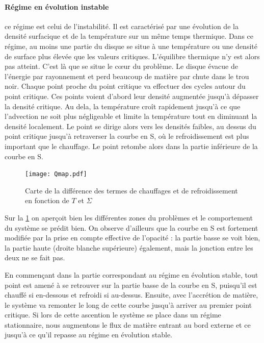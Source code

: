 \paragraph{Régime en évolution instable} ce régime est celui de l'instabilité.
Il est caractérisé par une évolution de la densité surfacique et de la
température sur un même temps thermique. Dans ce régime, au moins une partie du
disque se situe à une température ou une densité de surface plus élevée que les
valeurs critiques. L'équilibre thermique n'y est alors pas atteint. C'est là
que se situe le cœur du problème. Le disque évacue de l'énergie par rayonnement
et perd beaucoup de matière par chute dans le trou noir. Chaque point proche du
point critique va effectuer des cycles autour du point critique. Ces points
voient d'abord leur densité augmentée jusqu'à dépasser la densité critique. Au
dela, la température croît rapidement jusqu'à ce que l'advection ne soit plus
négligeable et limite la température tout en diminuant la densité localement.
Le point se dirige alors vers les densités faibles, au dessus du point critique
jusqu'à retraverser la courbe en S, où le refroidissement est plus important
que le chauffage. Le point retombe alors dans la partie inférieure de la courbe
en S. \\

\begin{figure}[!ht]
    \centering
    \texttt{[image: Qmap.pdf]}
    \caption{Carte de la différence des termes de chauffages et de refroidissement en fonction de $T$ et $\Sigma$}
    \label{fig:qmap}
\end{figure}

Sur la \cref{fig:qmap} on aperçoit bien les différentes zones du problèmes et
le comportement du système se prédit bien. On observe d’ailleurs que la courbe
en S est fortement modifiée par la prise en compte effective de l’opacité : la
partie basse se voit bien, la partie haute (droite blanche supérieure)
également, mais la jonction entre les deux ne se fait pas.

En commençant dans la partie correspondant au régime en évolution stable, tout point est amené à se
retrouver sur la partie basse de la courbe en S, puisqu’il est chauffé si
en-dessous et refroidi si au-dessus. Ensuite, avec l’accrétion de matière, le
système va remonter le long de cette courbe jusqu’à arriver au premier point
critique. Si lors de cette ascention le système se place dans un régime stationnaire, nous augmentons le flux de
matière entrant au bord externe et ce jusqu'à ce qu'il repasse au régime en évolution stable.


